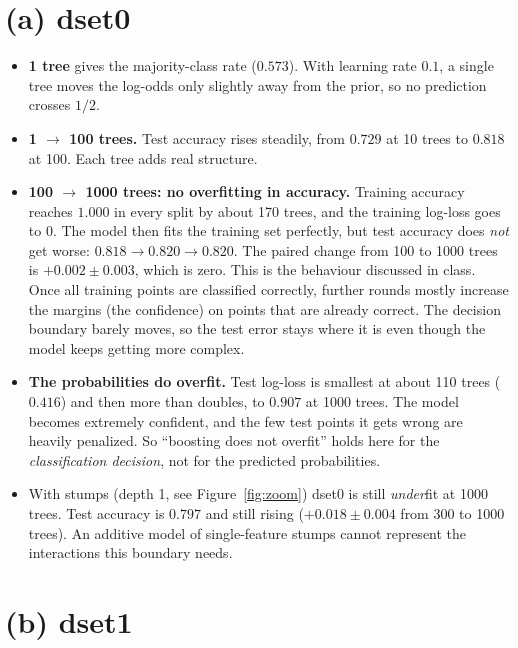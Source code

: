\documentclass[11pt]{article}
\begin{document}
\section*{(a) dset0}

\begin{itemize}
\item \textbf{1 tree} gives the majority-class rate ($0.573$). With learning rate $0.1$, a single
tree moves the log-odds only slightly away from the prior, so no prediction crosses $1/2$.
\item \textbf{1 $\to$ 100 trees.} Test accuracy rises steadily, from $0.729$ at 10 trees to
$0.818$ at 100. Each tree adds real structure.
\item \textbf{100 $\to$ 1000 trees: no overfitting in accuracy.} Training accuracy reaches $1.000$
in every split by about 170 trees, and the training log-loss goes to $0$. The model then fits the training set
perfectly, but test accuracy does \emph{not} get worse: $0.818\to0.820\to0.820$. The paired change
from 100 to 1000 trees is $+0.002\pm0.003$, which is zero. This is the behaviour discussed in
class. Once all training points are classified correctly, further rounds mostly increase the
margins (the confidence) on points that are already correct. The decision boundary barely moves,
so the test error stays where it is even though the model keeps getting more complex.
\item \textbf{The probabilities do overfit.} Test log-loss is smallest at about 110 trees
($0.416$) and then more than doubles, to $0.907$ at 1000 trees. The model becomes extremely
confident, and the few test points it gets wrong are heavily penalized. So ``boosting does not
overfit'' holds here for the \emph{classification decision}, not for the predicted probabilities.
\item With stumps (depth 1, see Figure~\ref{fig:zoom}) dset0 is still \emph{under}fit at 1000 trees.
Test accuracy is $0.797$ and still rising ($+0.018\pm0.004$ from 300 to 1000 trees). An
additive model of single-feature stumps cannot represent the interactions this boundary needs.
\end{itemize}

\section*{(b) dset1}
\end{document}
